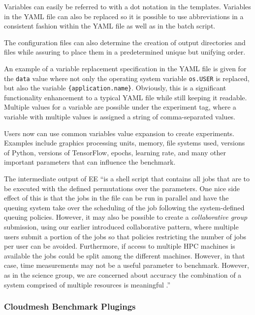 \documentclass[utf8]{FrontiersinVancouver} %
\begin{document}
Variables can easily be referred to with a dot notation in the templates.  Variables in the YAML file can also be replaced so it is possible to use abbreviations in a consistent fashion within the YAML file as well as in the batch script.

The configuration files can also determine the creation of output directories and files while assuring to place them in a predetermined unique but unifying order.

An example of a variable replacement specification in the YAML file is given for the \verb|data| value where not only the operating system variable \verb|os.USER| is replaced, but also the variable \verb|{application.name}|. Obviously, this is a significant functionality enhancement to a typical YAML file while still keeping it readable.  Multiple values for a variable are possible under the experiment tag, where a variable with multiple values is assigned a string of comma-separated values. 

Users now can use common variables value expansion to create experiments. Examples include graphics processing units, memory, file systems used, versions of Python, versions of TensorFlow, epochs, learning rate, and many other important parameters that can influence the benchmark.  

The intermediate output of EE ``is a shell script that contains all jobs that are to be executed with the defined permutations over the parameters. One nice side effect of this is that the jobs in the file can be run in parallel and have the queuing system take over the scheduling of the job following the system-defined queuing policies. However, it may also be possible to create a {\it collaborative group} submission, using our earlier introduced collaborative pattern, where multiple users submit a portion of the jobs so that policies restricting the number of jobs per user can be avoided. Furthermore, if access to multiple HPC machines is available the jobs could be split among the different machines. However, in that case, time measurements may not be a useful parameter to benchmark. However, as in the science group, we are concerned about accuracy the combination of a system comprised of multiple resources is meaningful \citep{las-2022-templated}.''


\subsubsection{Cloudmesh Benchmark Plugings}
\label{sec:monitoring}
\end{document}
